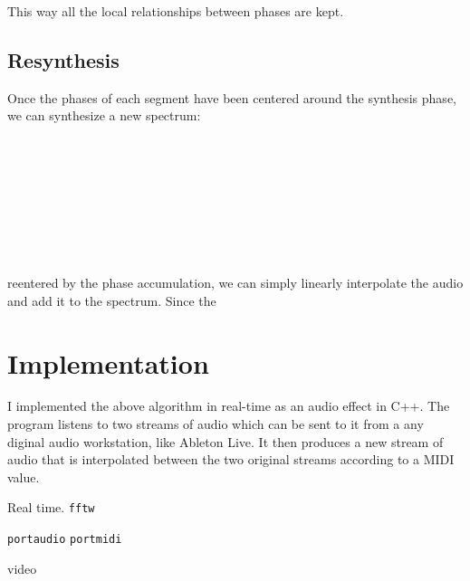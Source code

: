 \documentclass[12pt]{article}
\begin{document}
This way all the local relationships between phases are kept.

\subsection{Resynthesis}

Once the phases of each segment have been centered around the synthesis phase,
we can synthesize a new spectrum:

\begin{algorithmic}
\\
\EndFor
\\
  \\
  \\
    \\
    \\
    \\
  \EndFor
\EndFor
\end{algorithmic}


reentered by the phase accumulation, 
we can simply linearly interpolate the audio and add it to the spectrum.
Since the 

\section{Implementation}

I implemented the above algorithm in real-time as an audio effect in C++.
The program listens to two streams of audio
which can be sent to it from a any diginal audio workstation, like Ableton Live.
It then produces a new stream of audio that is interpolated between the two original streams according to a MIDI value.



Real time.
\texttt{fftw}

\texttt{portaudio}
\texttt{portmidi}

video
\end{document}
